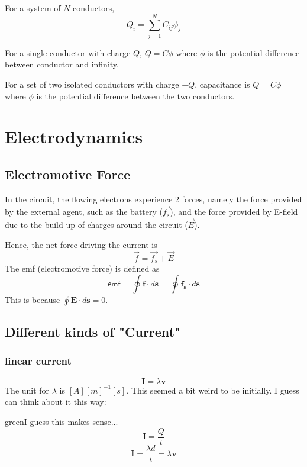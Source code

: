 For a system of $N$ conductors, 
\begin{equation}
    Q_i=\sum_{j=1}^N C_{ij} \phi_j
\end{equation}

For a single conductor with charge $Q$, $Q=C\phi$ where $\phi$ is the potential difference between conductor and infinity.

For a set of two isolated conductors with charge $\pm Q$, capacitance is $Q=C\phi$ where $\phi$ is the potential difference between the two conductors.

\section{Electrodynamics}
\subsection{Electromotive Force}

In the circuit, the flowing electrons experience 2 forces, namely the force provided by the external agent, such as the battery ($\vec{f_s}$), and the force provided by E-field due to the build-up of charges around the circuit ($\vec{E}$).

Hence, the net force driving the current is
\begin{equation}
    \vec{f}=\vec{f_s}+\vec{E}
\end{equation}
The emf (electromotive force) is defined as
\begin{equation}
    \textsf{emf}=\oint \mathbf{f} \cdot d\mathbf{s}=\oint \mathbf{f_s} \cdot d\mathbf{s}
\end{equation}
This is because $\oint \mathbf{E} \cdot d\mathbf{s}=0$.


\subsection{Different kinds of "Current"}
\subsubsection{linear current}
\begin{equation}
    \mathbf{I}=\lambda \mathbf{v}
\end{equation}
The unit for $\lambda$ is $[A][m]^{-1}[s]$.
This seemed a bit weird to be initially. I guess can think about it this way:
\begin{mybox}{green}{I guess this makes sense...}
    \begin{equation}
        \mathbf{I}=\frac{Q}{t}
    \end{equation}
    \begin{equation}
        \mathbf{I}=\frac{\lambda d}{t}=\lambda \mathbf{v}
    \end{equation}
\end{mybox}
